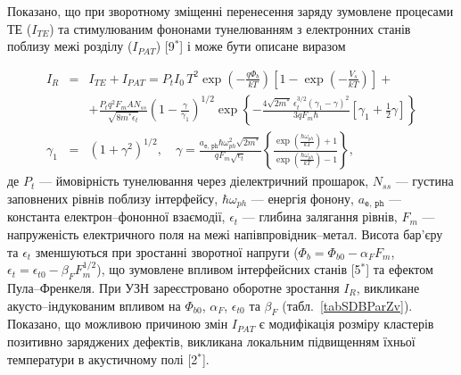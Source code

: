 Показано, що при зворотному зміщенні
перенесення заряду зумовлене процесами ТЕ ($I_{TE}$) та
стимулюваним фононами тунелюванням з електронних станів поблизу межі розділу ($I_{P\!AT}$)
[9$^*$]
і може бути описане виразом

\begin{eqnarray}
\label{eqIgen}
 I_R&=&I_{TE}+I_{P\!AT}=P_tI_0\,T^2\exp\left(-\frac{q\Phi_b}{kT}\right)\left[1-\exp\left(-\frac{V_s}{kT}\right)\right]+\\
 &&+\frac{P_tq^2F_mAN_{ss}}{\sqrt{8m^*\epsilon_t}}\left(1-\frac{\gamma}{\gamma_1}\right)^{1/2}\exp
    \left\{-\frac{4\sqrt{2m^*}\,\epsilon_t^{3/2}\left(\gamma_1-\gamma\right)^2}{3qF_m\hbar} \nonumber
    [\gamma_1+\frac{1}{2}\gamma]\right\}\\ \nonumber
    \gamma_1&=&(1+\gamma^2)^{1/2}, \quad
    \gamma=\frac{a_\mathtt{e,\,ph}\hbar\omega_{ph}^2\sqrt{2m^*}}{qF_m\sqrt{\epsilon_t}}
    \left\{\frac{\exp\left(\frac{\hbar\omega_{ph}}{kT}\right)+1}{\exp\left(\frac{\hbar\omega_{ph}}{kT}\right)-1}\right\},   \nonumber
\end{eqnarray}
де
$P_t$ --- ймовірність тунелювання через діелектричний прошарок,
$N_{ss}$ --- густина заповнених рівнів поблизу інтерфейсу,
$\hbar\omega_{ph}$ --- енергія фонону,
$a_\mathtt{e,\,ph}$ --- константа електрон--фононної взаємодії,
$\epsilon_t$ --- глибина залягання рівнів,
$F_m$ --- напруженість електричного поля на межі напівпровідник--метал.
Висота бар'єру та $\epsilon_t$ зменшуються при зростанні зворотної напруги
($\Phi_{b}=\Phi_{b0}-\alpha_{F} F_m$,
$\epsilon_t=\epsilon_{t0}-\beta_F F_m^{1/2}$), що зумовлене впливом інтерфейсних станів
[5$^*$] та ефектом Пула--Френкеля.
При УЗН зареєстровано оборотне зростання $I_R$, викликане
акусто--індукованим впливом на $\Phi_{b0}$, $\alpha_{F}$, $\epsilon_{t0}$ та $\beta_F$ (табл.~\ref{tabSDBParZv}).
Показано, що можливою причиною
змін $I_{P\!AT}$ є модифікація розміру кластерів позитивно заряджених дефектів, викликана
локальним підвищенням їхньої температури в акустичному полі
[2$^*$].



